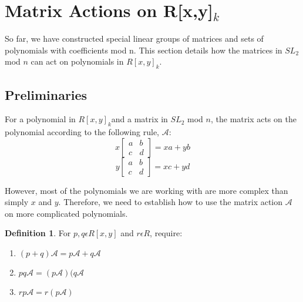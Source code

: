 \documentclass[a4paper,draft]{amsproc}
\theoremstyle{plain}
\theoremstyle{definition}
\newtheorem{dfn}{Definition}[section]
\theoremstyle{remark}
\numberwithin{equation}{section}
\begin{document}
\section{Matrix Actions on R[x,y]$_{k}$} 
So far, we have constructed special linear groups of matrices and sets of polynomials with coefficients mod n. This section details how the matrices in $SL_{2}$ mod $n$ can act on polynomials in $R[x,y]_{k}$. 

\subsection{Preliminaries}
For a polynomial in $R[x,y]_{k}$and a matrix in $SL_{2}$ mod $n$, the matrix acts on the polynomial according to the following rule, $\mathcal{A}$: 
$$
x\begin{bmatrix}
 a&b \\ 
 c&d 
\end{bmatrix} = xa + yb 
$$
$$
y\begin{bmatrix}
 a&b \\ 
 c&d 
\end{bmatrix} = xc + yd 
$$

However, most of the polynomials we are working with are more complex than simply $x$ and $y$. Therefore, we need to establish how to use the matrix action $\mathcal{A}$ on more complicated polynomials. 
\begin{dfn}
For $p, q \epsilon R[x,y]$ and $r \epsilon R$, require: 
\begin{enumerate}
\item $(p+q)\mathcal{A} = p\mathcal{A} + q\mathcal{A}$
\item $pq\mathcal{A} = (p\mathcal{A})(q\mathcal{A}$
\item $rp\mathcal{A} = r(p\mathcal{A})$
\end{enumerate}
\end{dfn}
\end{document}
